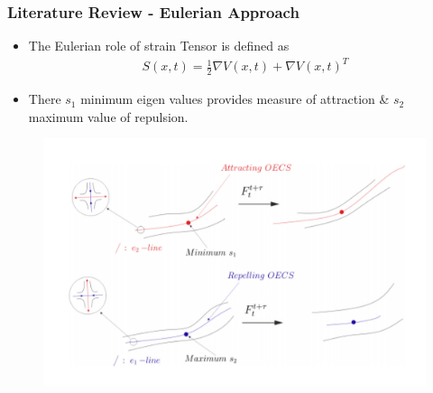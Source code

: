 \documentclass[../presentation.tex]{subfiles}
\begin{document}
\begin{frame}
  \frametitle{Literature Review - Eulerian Approach}

  \begin{itemize}
    \item The Eulerian role of strain Tensor is defined as
    \begin{equation}
      \begin{aligned}
        S(x, t) = \frac{1}{2}{\nabla V(x, t) + \nabla V(x, t)^T}
      \end{aligned}
    \end{equation}
    
    \item There \(s_1\) \rightarrow minimum eigen values provides measure of attraction \& \(s_2\) maximum value of repulsion.
  \end{itemize}

  \begin{figure}[H]
    \centering
    \includegraphics[width=0.6\linewidth]{images/figure4.png}
  \end{figure}
\end{frame}
\end{document}
